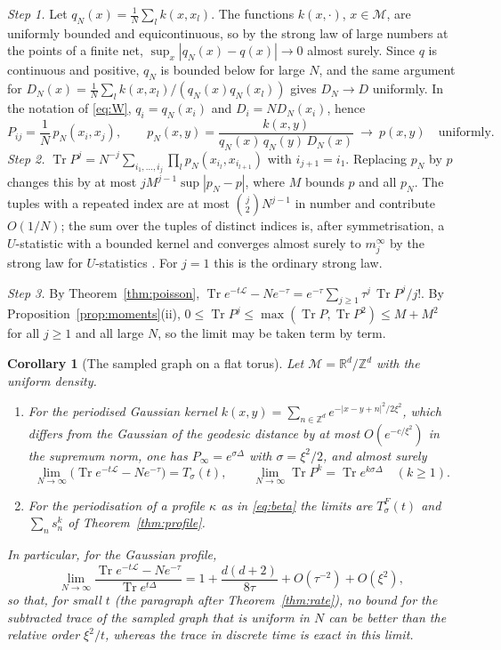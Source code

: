 \documentclass[11pt,a4paper]{article}
\makeatletter
\theoremstyle{stmt}
\newtheorem{corollary}[theorem]{Corollary}
\theoremstyle{defn}
\theoremstyle{rmk}
\renewenvironment{proof}[1][\proofname]{\par\pushQED{\qed}\normalfont\topsep6\p@\@plus6\p@\relax
  \trivlist\item[\hskip\labelsep{\sffamily\itshape\small #1.}]\ignorespaces}{\popQED\endtrivlist\@endpefalse}
\numberwithin{equation}{section}
\DeclareMathOperator{\Tr}{Tr}
\newcommand{\M}{\mathcal{M}}
\newcommand{\Lc}{\mathcal{L}}
\newcommand{\R}{\mathbb{R}}
\makeatother
\begin{document}
{\begin{proof}
\emph{Step 1.} Let $q_N(x)=\frac1N\sum_lk(x,x_l)$. The functions $k(x,\cdot)$, $x\in\M$, are uniformly bounded and equicontinuous, so by the strong law of large numbers at the points of a finite net, $\sup_x|q_N(x)-q(x)|\to0$ almost surely. Since $q$ is continuous and positive, $q_N$ is bounded below for large $N$, and the same argument for $D_N(x)=\frac1N\sum_lk(x,x_l)/(q_N(x)q_N(x_l))$ gives $D_N\to D$ uniformly. In the notation of \eqref{eq:W}, $q_i=q_N(x_i)$ and $D_i=ND_N(x_i)$, hence
\[
P_{ij}=\frac1N\,p_N(x_i,x_j),\qquad p_N(x,y)=\frac{k(x,y)}{q_N(x)\,q_N(y)\,D_N(x)}\ \longrightarrow\ p(x,y)\quad\text{uniformly.}
\]
\emph{Step 2.} $\Tr P^j=N^{-j}\sum_{i_1,\dots,i_j}\prod_lp_N(x_{i_l},x_{i_{l+1}})$ with $i_{j+1}=i_1$. Replacing $p_N$ by $p$ changes this by at most $jM^{j-1}\sup|p_N-p|$, where $M$ bounds $p$ and all $p_N$. The tuples with a repeated index are at most $\binom j2N^{j-1}$ in number and contribute $O(1/N)$; the sum over the tuples of distinct indices is, after symmetrisation, a $U$-statistic with a bounded kernel and converges almost surely to $m_j^\infty$ by the strong law for $U$-statistics \cite{Serfling}. For $j=1$ this is the ordinary strong law.

\emph{Step 3.} By Theorem~\ref{thm:poisson}, $\Tr e^{-t\Lc}-Ne^{-\tau}=e^{-\tau}\sum_{j\ge1}\tau^j\,\Tr P^j/j!$. By Proposition~\ref{prop:moments}(ii), $0\le\Tr P^j\le\max(\Tr P,\Tr P^2)\le M+M^2$ for all $j\ge1$ and all large $N$, so the limit may be taken term by term.
\end{proof}

\begin{corollary}[The sampled graph on a flat torus]\label{cor:torus}
Let $\M=\R^d/\mathbb Z^d$ with the uniform density.
\begin{enumerate}[label=\textup{(\roman*)}]
\item For the periodised Gaussian kernel $k(x,y)=\sum_{n\in\mathbb Z^d}e^{-|x-y+n|^2/2\xi^2}$, which differs from the Gaussian of the geodesic distance by at most $O(e^{-c/\xi^2})$ in the supremum norm, one has $P_\infty=e^{\sigma\Delta}$ with $\sigma=\xi^2/2$, and almost surely
\[
\lim_{N\to\infty}\big(\Tr e^{-t\Lc}-Ne^{-\tau}\big)=T_\sigma(t),\qquad\lim_{N\to\infty}\Tr P^k=\Tr e^{k\sigma\Delta}\quad(k\ge1).
\]
\item For the periodisation of a profile $\kappa$ as in \eqref{eq:beta} the limits are $T^F_\sigma(t)$ and $\sum_ns_n^k$ of Theorem~\ref{thm:profile}.
\end{enumerate}
In particular, for the Gaussian profile,
\[
\lim_{N\to\infty}\frac{\Tr e^{-t\Lc}-Ne^{-\tau}}{\Tr e^{t\Delta}}=1+\frac{d(d+2)}{8\tau}+O(\tau^{-2})+O(\xi^2),
\]
so that, for small $t$ (the paragraph after Theorem~\ref{thm:rate}), no bound for the subtracted trace of the sampled graph that is uniform in $N$ can be better than the relative order $\xi^2/t$, whereas the trace in discrete time is exact in this limit.
\end{corollary}

}
\end{document}
